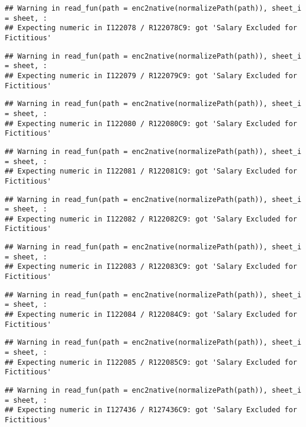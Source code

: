 \documentclass[
]{article}
\begin{document}
\begin{verbatim}
## Warning in read_fun(path = enc2native(normalizePath(path)), sheet_i = sheet, :
## Expecting numeric in I122078 / R122078C9: got 'Salary Excluded for Fictitious'
\end{verbatim}

\begin{verbatim}
## Warning in read_fun(path = enc2native(normalizePath(path)), sheet_i = sheet, :
## Expecting numeric in I122079 / R122079C9: got 'Salary Excluded for Fictitious'
\end{verbatim}

\begin{verbatim}
## Warning in read_fun(path = enc2native(normalizePath(path)), sheet_i = sheet, :
## Expecting numeric in I122080 / R122080C9: got 'Salary Excluded for Fictitious'
\end{verbatim}

\begin{verbatim}
## Warning in read_fun(path = enc2native(normalizePath(path)), sheet_i = sheet, :
## Expecting numeric in I122081 / R122081C9: got 'Salary Excluded for Fictitious'
\end{verbatim}

\begin{verbatim}
## Warning in read_fun(path = enc2native(normalizePath(path)), sheet_i = sheet, :
## Expecting numeric in I122082 / R122082C9: got 'Salary Excluded for Fictitious'
\end{verbatim}

\begin{verbatim}
## Warning in read_fun(path = enc2native(normalizePath(path)), sheet_i = sheet, :
## Expecting numeric in I122083 / R122083C9: got 'Salary Excluded for Fictitious'
\end{verbatim}

\begin{verbatim}
## Warning in read_fun(path = enc2native(normalizePath(path)), sheet_i = sheet, :
## Expecting numeric in I122084 / R122084C9: got 'Salary Excluded for Fictitious'
\end{verbatim}

\begin{verbatim}
## Warning in read_fun(path = enc2native(normalizePath(path)), sheet_i = sheet, :
## Expecting numeric in I122085 / R122085C9: got 'Salary Excluded for Fictitious'
\end{verbatim}

\begin{verbatim}
## Warning in read_fun(path = enc2native(normalizePath(path)), sheet_i = sheet, :
## Expecting numeric in I127436 / R127436C9: got 'Salary Excluded for Fictitious'
\end{verbatim}
\end{document}
